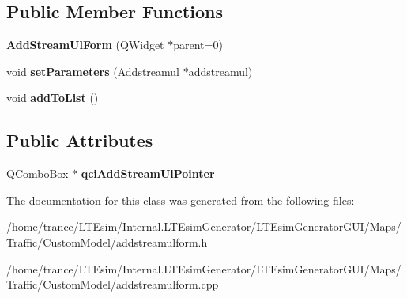 \subsection*{Public Member Functions}
\begin{DoxyCompactItemize}
\item 
{\bfseries Add\+Stream\+Ul\+Form} (Q\+Widget $\ast$parent=0)\hypertarget{class_add_stream_ul_form_ac6ff3e6edb9919bd1f3c354caee371d7}{}\label{class_add_stream_ul_form_ac6ff3e6edb9919bd1f3c354caee371d7}

\item 
void {\bfseries set\+Parameters} (\hyperlink{class_addstreamul}{Addstreamul} $\ast$addstreamul)\hypertarget{class_add_stream_ul_form_a9310c3ac793231fa3b1e55c28bf727ea}{}\label{class_add_stream_ul_form_a9310c3ac793231fa3b1e55c28bf727ea}

\item 
void {\bfseries add\+To\+List} ()\hypertarget{class_add_stream_ul_form_a646161aaf47baf44fe186ec9b211d2c0}{}\label{class_add_stream_ul_form_a646161aaf47baf44fe186ec9b211d2c0}

\end{DoxyCompactItemize}
\subsection*{Public Attributes}
\begin{DoxyCompactItemize}
\item 
Q\+Combo\+Box $\ast$ {\bfseries qci\+Add\+Stream\+Ul\+Pointer}\hypertarget{class_add_stream_ul_form_ab429b43b14ef862b4c29bc13a872021a}{}\label{class_add_stream_ul_form_ab429b43b14ef862b4c29bc13a872021a}

\end{DoxyCompactItemize}


The documentation for this class was generated from the following files\+:\begin{DoxyCompactItemize}
\item 
/home/trance/\+L\+T\+Esim/\+Internal.\+L\+T\+Esim\+Generator/\+L\+T\+Esim\+Generator\+G\+U\+I/\+Maps/\+Traffic/\+Custom\+Model/addstreamulform.\+h\item 
/home/trance/\+L\+T\+Esim/\+Internal.\+L\+T\+Esim\+Generator/\+L\+T\+Esim\+Generator\+G\+U\+I/\+Maps/\+Traffic/\+Custom\+Model/addstreamulform.\+cpp\end{DoxyCompactItemize}
